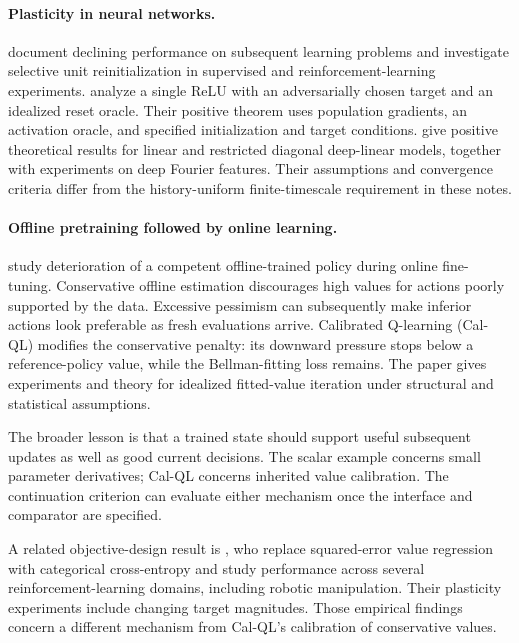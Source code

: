 \documentclass[11pt,twoside]{article}
\theoremstyle{definition}
\theoremstyle{remark}
\begin{document}
\paragraph{Plasticity in neural networks.}
\citet{dohare2024} document declining performance on subsequent learning
problems and investigate selective unit reinitialization in supervised and
reinforcement-learning experiments.
\citet{farias2025} analyze a single ReLU with an adversarially chosen target
and an idealized reset oracle. Their positive theorem uses population
gradients, an activation oracle, and specified initialization and target
conditions.
\citet{lewandowski2025} give positive theoretical results for linear and
restricted diagonal deep-linear models, together with experiments on deep
Fourier features. Their assumptions and convergence criteria differ from
the history-uniform finite-timescale requirement in these notes.

\paragraph{Offline pretraining followed by online learning.}
\citet{nakamoto2023} study deterioration of a competent offline-trained
policy during online fine-tuning. Conservative offline estimation discourages
high values for actions poorly supported by the data. Excessive pessimism
can subsequently make inferior actions look preferable as fresh evaluations
arrive. Calibrated Q-learning (Cal-QL) modifies the conservative penalty:
its downward pressure stops below a reference-policy value, while the
Bellman-fitting loss remains. The paper gives experiments and theory for
idealized fitted-value iteration under structural and statistical
assumptions.

The broader lesson is that a trained state should support useful subsequent
updates as well as good current decisions. The scalar example concerns
small parameter derivatives; Cal-QL concerns inherited value calibration.
The continuation criterion can evaluate either mechanism once the interface
and comparator are specified.

A related objective-design result is \citet{farebrother2024}, who replace
squared-error value regression with categorical cross-entropy and study
performance across several reinforcement-learning domains, including
robotic manipulation. Their plasticity experiments include changing target
magnitudes. Those empirical findings concern a different mechanism from
Cal-QL's calibration of conservative values.
\end{document}
